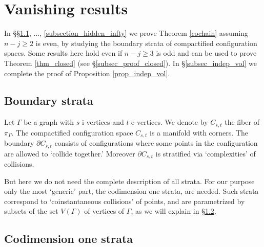 \section{Vanishing results}\label{sec_vanish}


In \S\S \ref{subsection_boundary_survey}, ..., \ref{subsection_hidden_infty} we prove Theorem \ref{cochain} assuming
$n-j \ge 2$ is even, by studying the boundary strata of compactified configuration spaces.
Some results here hold even if $n-j\ge 3$ is odd and can be used to prove Theorem \ref{thm_closed}
(see \S \ref{subsec_proof_closed}).
In \S \ref{subsec_indep_vol} we complete the proof of Proposition \ref{prop_indep_vol}.





\subsection{Boundary strata}\label{subsection_boundary_survey}


Let $\Gamma$ be a graph with $s$ i-vertices and $t$ e-vertices.
We denote by $C_{s,t}$ the fiber of $\pi_{\Gamma}$.
The compactified configuration space $C_{s,t}$ is a manifold with corners.
The boundary $\partial C_{s,t}$ consists of configurations where some points in the configuration are allowed to
`collide together.'
Moreover $\partial C_{s,t}$ is stratified via `complexities' of collisions.


But here we do not need the complete description of all strata.
For our purpose only the most `generic' part, the codimension one strata, are needed.
Such strata correspond to `coinstantaneous collisions' of points, and are parametrized by subsets of the set
$V(\Gamma )$ of vertices of $\Gamma$, as we will explain in \S \ref{subsection_boundary_strata}.





\subsection{Codimension one strata}\label{subsection_boundary_strata}


